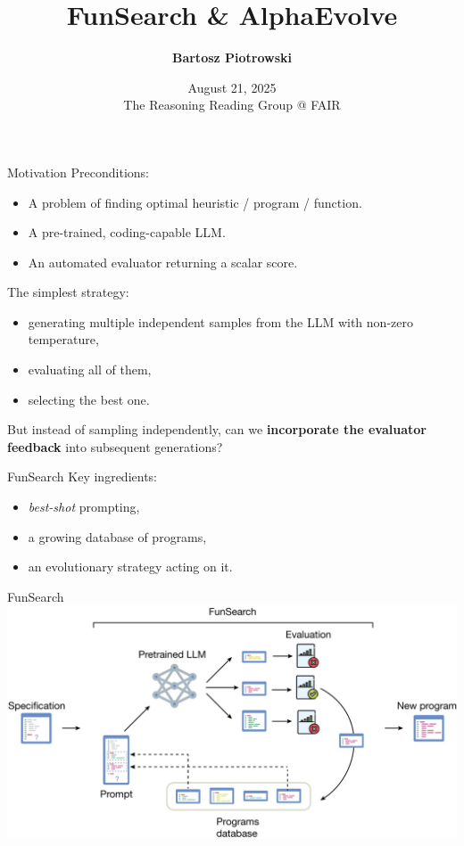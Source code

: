 \documentclass{beamer}
\title{\textbf{FunSearch \& AlphaEvolve}}
\author{
\textbf{
Bartosz Piotrowski
}}
\date{
August 21, 2025\\
The Reasoning Reading Group @ FAIR
}
\begin{document}
\begin{frame}
  \titlepage
\end{frame}

\begin{frame}{Motivation}
Preconditions:
\begin{itemize}
\item A problem of finding optimal heuristic / program / function.
\item A pre-trained, coding-capable LLM.
\item An automated evaluator returning a scalar score.
\end{itemize}
\pause
The simplest strategy:
\begin{itemize}
\item generating multiple independent samples from the LLM with non-zero
 temperature,
\item evaluating all of them,
\item selecting the best one.
\end{itemize}

\pause
But instead of sampling independently, can we \textbf{incorporate the evaluator
feedback} into subsequent generations?

\end{frame}

\begin{frame}{FunSearch}
Key ingredients:
\begin{itemize}
\item \textit{best-shot} prompting,
\item a growing database of programs,
\item an evolutionary strategy acting on it.
\end{itemize}
\end{frame}

\begin{frame}{FunSearch}
\includegraphics[width=\linewidth]{figures/funsearch-overview.png}
\end{frame}
\end{document}
